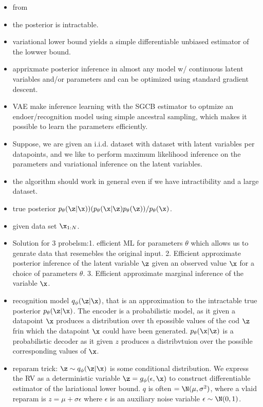 \begin{itemize}
    \item from \cite{KingmaWelling}
    \item the posterior is intractable. 
    \item variational lower bound yields a simple differentiable unbiased estimator of the lowwer bound. 
    \item apprixmate posterior inference in almost any model w/ continuous latent variables and/or parameters and can be optimized using standard gradient descent.
    \item VAE make inference learning with the SGCB estimator to optmize an endoer/recognition model using simple ancestral sampling, which makes it possible to learn the parameters efficiently.
    \item Suppose, we are given an i.i.d. dataset with dataset with latent variables per datapoints, and we like to perform maximum likelihood inference on the parameters and variational inference on the latent variables.
    \item the algorithm should work in general even if we have intractibility and a large dataset.
    \item true posterior $p_{\theta}(\z|\x) ) (p_{\theta}(\x|\z)p_{\theta}(\z))/p_{\theta}(\x)$.
    \item given data set $\x_{1:N}$. 
    \item Solution for 3 probelsm:1. efficient ML for parameters $\theta$ which allows us to genrate data that resemebles the original input. 2. Efficient approximate posterior inference of the latent variable $\z$ given an observed value $\x$ for a choice of parameters $\theta$. 3. Efficient approximate marginal inference of the variable $\x$.
    \item recognition model $q_{\phi}(\z|\x)$, that is an approximation to the intractable true posterior $p_{\theta}(\z|\x)$. The encoder is a probabilistic model, as it given a datapoint $\x$ produces a distribution over th epossible values of the cod $\z$ frin which  the datapoint $\x$ could have been generated. $p_{\theta}(\x|\z)$ is a probabilistic decoder as it given $z$ produces a distribvtuion over the possible corresponding values of $\x$. 
    \item reparam trick: $\z \sim q_{\phi}(\z|\x)$ is some conditional distribution. We express the RV as a deterministic variable $\z = g_{\phi}(\epsilon, \x)$ to construct differentiable estimator of the lariational lower bound. $q$ is often $=\N(\mu, \sigma^2)$, where a vlaid reparam is $z = \mu + \sigma \epsilon$ where $\epsilon$ is an auxiliary noise variable $\epsilon \sim \N(0, 1)$.

\end{itemize}
